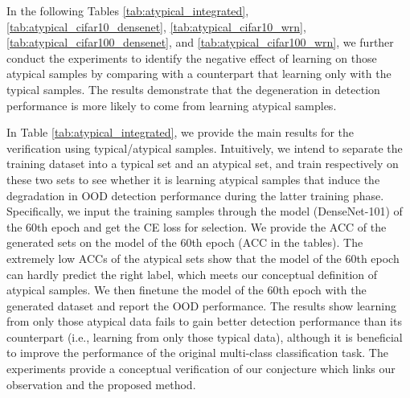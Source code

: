 \documentclass{article}
\theoremstyle{plain}
\theoremstyle{definition}
\theoremstyle{remark}
\begin{document}
In the following Tables \ref{tab:atypical_integrated}, \ref{tab:atypical_cifar10_densenet}, \ref{tab:atypical_cifar10_wrn}, \ref{tab:atypical_cifar100_densenet}, and \ref{tab:atypical_cifar100_wrn}, we further conduct the experiments to identify the negative effect of learning on those atypical samples by comparing with a counterpart that learning only with the typical samples. The results demonstrate that the degeneration in detection performance is more likely to come from learning atypical samples.

In Table \ref{tab:atypical_integrated}, we provide the main results for the verification using typical/atypical samples. Intuitively, we intend to separate the training dataset into a typical set and an atypical set, and train respectively on these two sets to see whether it is learning atypical samples that induce the degradation in OOD detection performance during the latter  training phase. Specifically, we input the training samples through the model (DenseNet-101) of the 60th epoch and get the CE loss for selection. We provide the ACC of the generated sets on the model of the 60th epoch (ACC in the tables). The extremely low ACCs of the atypical sets show that the model of the 60th epoch can hardly predict the right label, which meets our conceptual definition of atypical samples. We then finetune the model of the 60th epoch with the generated dataset and report the OOD performance. The results show learning from only those atypical data fails to gain better detection performance than its counterpart (i.e., learning from only those typical data), although it is beneficial to improve the performance of the original multi-class classification task. The experiments provide a conceptual verification of our conjecture which links our observation and the proposed method.
\end{document}
